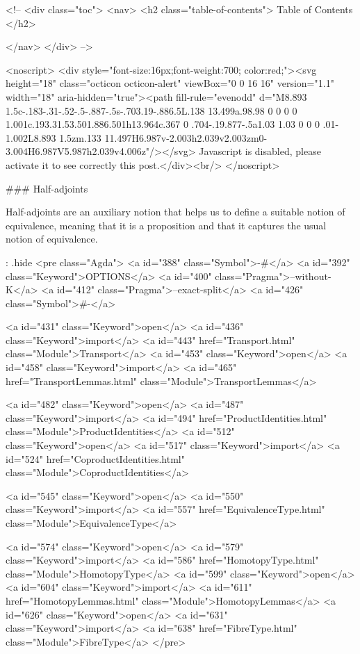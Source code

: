   <!-- 
  <div class="toc">
    <nav>
    <h2 class="table-of-contents"> Table of Contents </h2>
      

    </nav>
  </div>
   -->

  <noscript>
  <div style="font-size:16px;font-weight:700; color:red;"><svg height="18" class="octicon octicon-alert" viewBox="0 0 16 16" version="1.1" width="18" aria-hidden="true"><path fill-rule="evenodd" d="M8.893 1.5c-.183-.31-.52-.5-.887-.5s-.703.19-.886.5L.138 13.499a.98.98 0 0 0 0 1.001c.193.31.53.501.886.501h13.964c.367 0 .704-.19.877-.5a1.03 1.03 0 0 0 .01-1.002L8.893 1.5zm.133 11.497H6.987v-2.003h2.039v2.003zm0-3.004H6.987V5.987h2.039v4.006z"/></svg> Javascript is disabled, please activate it to see correctly this post.</div><br/>
  </noscript>

  ### Half-adjoints

Half-adjoints are an auxiliary notion that helps us to define a suitable notion
of equivalence, meaning that it is a proposition and that it captures the usual
notion of equivalence.

{: .hide}
<pre class="Agda">
<a id="388" class="Symbol">{-#</a> <a id="392" class="Keyword">OPTIONS</a> <a id="400" class="Pragma">--without-K</a> <a id="412" class="Pragma">--exact-split</a> <a id="426" class="Symbol">#-}</a>

<a id="431" class="Keyword">open</a> <a id="436" class="Keyword">import</a> <a id="443" href="Transport.html" class="Module">Transport</a>
<a id="453" class="Keyword">open</a> <a id="458" class="Keyword">import</a> <a id="465" href="TransportLemmas.html" class="Module">TransportLemmas</a>

<a id="482" class="Keyword">open</a> <a id="487" class="Keyword">import</a> <a id="494" href="ProductIdentities.html" class="Module">ProductIdentities</a>
<a id="512" class="Keyword">open</a> <a id="517" class="Keyword">import</a> <a id="524" href="CoproductIdentities.html" class="Module">CoproductIdentities</a>

<a id="545" class="Keyword">open</a> <a id="550" class="Keyword">import</a> <a id="557" href="EquivalenceType.html" class="Module">EquivalenceType</a>

<a id="574" class="Keyword">open</a> <a id="579" class="Keyword">import</a> <a id="586" href="HomotopyType.html" class="Module">HomotopyType</a>
<a id="599" class="Keyword">open</a> <a id="604" class="Keyword">import</a> <a id="611" href="HomotopyLemmas.html" class="Module">HomotopyLemmas</a>
<a id="626" class="Keyword">open</a> <a id="631" class="Keyword">import</a> <a id="638" href="FibreType.html" class="Module">FibreType</a>
</pre>

